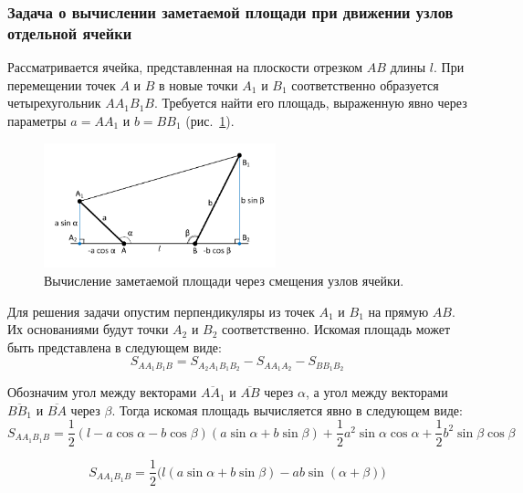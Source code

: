 \subsubsection{Задача о вычислении заметаемой площади при движении узлов отдельной ячейки}

Рассматривается ячейка, представленная на плоскости отрезком $AB$ длины $l$.
При перемещении точек $A$ и $B$ в новые точки $A_1$ и $B_1$ соответственно образуется четырехугольник $AA_1B_1B$.
Требуется найти его площадь, выраженную явно через параметры $a = AA_1$ и $b = BB_1$ (рис.~\ref{fig:text_1_remesh_2d_local}).

\begin{figure}[ht]
\centering
\includegraphics[width=0.6\textwidth]{pics/text_1_remesh_2d/local.pdf}
\singlespacing
{}\caption{Вычисление заметаемой площади через смещения узлов ячейки.}
\label{fig:text_1_remesh_2d_local}
\end{figure}

Для решения задачи опустим перпендикуляры из точек $A_1$ и $B_1$ на прямую $AB$.
Их основаниями будут точки $A_2$ и $B_2$ соответственно.
Искомая площадь может быть представлена в следующем виде:
\begin{equation}
S_{AA_1B_1B} = S_{A_2A_1B_1B_2} - S_{AA_1A_2} - S_{BB_1B_2}
\end{equation}

Обозначим угол между векторами $\overline{AA_1}$ и $\overline{AB}$ через $\alpha$, а угол между векторами $\overline{BB_1}$ и $\overline{BA}$ через $\beta$.
Тогда искомая площадь вычисляется явно в следующем виде:
\begin{equation}
S_{AA_1B_1B} = \frac{1}{2}(l - a \cos \alpha - b \cos \beta)(a \sin \alpha + b \sin \beta) + \frac{1}{2}a^2 \sin \alpha \cos \alpha + \frac{1}{2}b^2 \sin \beta \cos \beta
\end{equation}

\begin{equation}\label{eqn:text_1_remesh2_loca_square}
S_{AA_1B_1B} = \frac{1}{2}\big(l(a \sin \alpha + b \sin \beta) - ab \sin(\alpha + \beta)\big)
\end{equation}

